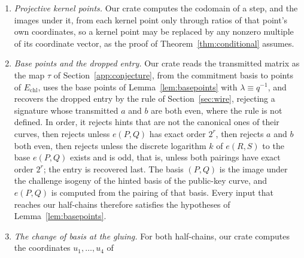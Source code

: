 \documentclass[version=preprint]{iacrcc}
\newcommand{\Echl}{E_{\mathrm{chl}}}
\begin{document}
\begin{remark}[Conformance]
\begin{enumerate}[label=(\alph*)]
            and rejects every $m > 40$. So every input that reaches our
            half-chains has $a_1$ odd and $1 \le m \le 40$, as
            Lemma~\ref{lem:gluing} requires. Before Cornacchia's algorithm, our
            verifier repeats the goodness test of Section~\ref{sec:verif} and
            rejects a degree that is not good; being deterministic, it runs its 40
            Miller--Rabin rounds on the first 40 primes as bases. Our signer
            applies the same deterministic test and the same bound on $m$ to
            every candidate degree, so it never produces a signature that the
            verifier rejects for either reason. The properties above are all
            that this appendix uses.
            \item \emph{Projective kernel points.} Our crate computes the codomain
            of a step, and the images under it, from each kernel point only through
            ratios of that point's own coordinates, so a kernel point may be
            replaced by any nonzero multiple of its coordinate vector, as the proof
            of Theorem~\ref{thm:conditional} assumes.
            \item \emph{Base points and the dropped entry.} Our crate reads the
            transmitted matrix as the map $\tau$ of Section~\ref{app:conjecture},
            from the commitment basis to points of $\Echl$, uses the base points
            of Lemma~\ref{lem:basepoints} with $\lambda \equiv q^{-1}$, and
            recovers the dropped entry by the rule of Section~\ref{sec:wire},
            rejecting a signature whose transmitted $a$ and $b$ are both even,
            where the rule is not defined. In order, it rejects hints that
            are not the canonical ones of their curves, then rejects unless
            $e(P, Q)$ has exact order $2^r$, then rejects $a$ and $b$ both
            even, then rejects unless the discrete logarithm $k$ of
            $e(R, S)$ to the base $e(P, Q)$ exists and is odd, that is, unless both
            pairings have exact order $2^r$; the entry is recovered last.
            The basis $(P, Q)$ is the image under the challenge isogeny of
            the hinted basis of the public-key curve, and $e(P, Q)$ is
            computed from the pairing of that basis. Every input that reaches our
            half-chains therefore satisfies the hypotheses of
            Lemma~\ref{lem:basepoints}.
            \item \emph{The change of basis at the gluing.} For both half-chains,
            our crate computes the coordinates $u_1, \ldots, u_4$ of

\end{enumerate}
\end{remark}
\end{document}
